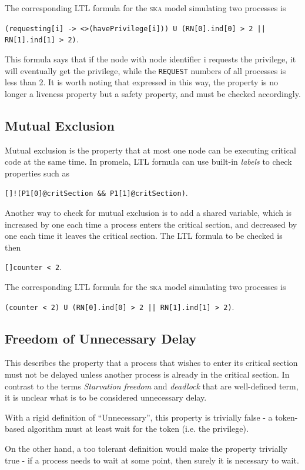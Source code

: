 \documentclass[a4paper,10pt]{llncs}
\begin{document}
The corresponding LTL formula for the \textsc{ska} model simulating two processes is

 \texttt{(requesting[i] -> <>(havePrivilege[i])) U (RN[0].ind[0] > 2 || RN[1].ind[1] > 2)}.

This formula says that if the node with node identifier i requests the privilege, it will eventually get the privilege, while the \texttt{REQUEST} numbers of all processes is less than 2. It is worth noting that expressed in this way, the property is no longer a liveness property but a safety property, and must be checked accordingly.

\subsection{Mutual Exclusion}
Mutual exclusion is the property that at most one node can be executing critical code at the same time. In promela, LTL formula can use built-in \emph{labels} to check properties such as

\texttt{[]!(P1[0]@critSection \&\& P1[1]@critSection)}.

Another way to check for mutual exclusion is to add a shared variable, which is increased by one each time a process enters the critical section, and decreased by one each time it leaves the critical section. The LTL formula to be checked is then

\texttt{[]counter < 2}.

The corresponding LTL formula for the \textsc{ska} model simulating two processes is

\texttt{(counter < 2) U (RN[0].ind[0] > 2 || RN[1].ind[1] > 2)}.

\subsection{Freedom of Unnecessary Delay}
\label{sec:delay}

This describes the property that a process that wishes to enter its critical section must not be delayed unless another process is already in the critical section. In contrast to the terms \emph{Starvation freedom} and \emph{deadlock} that are well-defined term, it is unclear what is to be considered unnecessary delay.

With a rigid definition of ``Unnecessary'', this property is trivially false - a token-based algorithm must at least wait for the token (i.e. the privilege).

On the other hand, a too tolerant definition would make the property trivially true - if a process needs to wait at some point, then surely it is necessary to wait.
\end{document}

